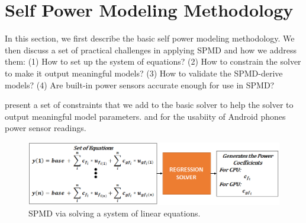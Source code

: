 \section{Self Power Modeling Methodology}
\label{sec:method}

In this section, we first describe the basic self power modeling
methodology. We then discuss a set of practical challenges in applying
SPMD  and how we address them:
(1) How to set up the system of equations?
(2) How to constrain the solver to make it output meaningful models?
(3) How to validate the SPMD-derive models?
(4) Are built-in power sensors accurate enough for use in SPMD?

present a set of constraints that we add to the
basic solver to help the solver to output meaningful model parameters.
and for the usabiity of Android phones power sensor readings.
\fi

\begin{figure}[tp]
    \centering
    \includegraphics[width=0.95\columnwidth]{figures/design_2.png}
    \vspace{-0.1in}
    \caption{SPMD via solving a system of linear equations.}
    \label{fig:equations}
    \vspace{-0.1in}
\end{figure}
\fi

